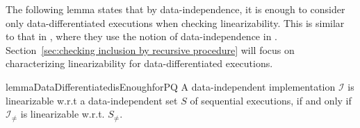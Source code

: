 The following lemma states that by data-independence, it is enough to consider only data-differentiated executions when checking linearizability. This is similar to that in \cite{conf/tacas/AbdullaHHJR13,DBLP:conf/icalp/BouajjaniEEH15}, where they use the notion of data-independence in \cite{conf/popl/Wolper86}. 
Section~\ref{sec:checking inclusion by recursive procedure} will focus on characterizing linearizability for data-differentiated executions. %

\begin{restatable}{lemma}{DataDifferentiatedisEnoughforPQ}
\label{lemma:data differentiated is enough for PQ}
A data-independent implementation $\mathcal{I}$ is linearizable w.r.t a data-independent set $S$ of sequential executions, if and only if $\mathcal{I}_{\neq}$ is linearizable w.r.t. $S_{\neq}$.
\end{restatable}


